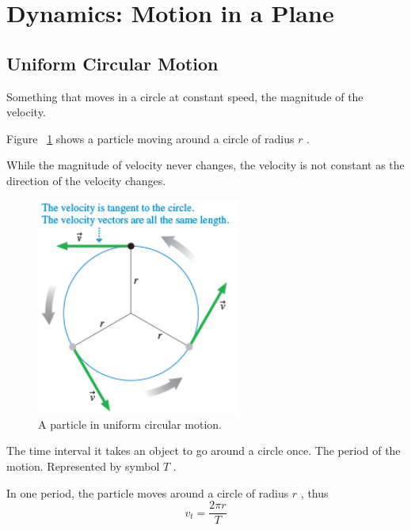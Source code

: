 \section{Dynamics:  Motion in a Plane}

\subsection{Uniform Circular Motion}

\begin{definition}
    Something that moves in a circle at constant speed, the magnitude of
    the velocity.
\end{definition}

Figure~%
\ref{fig:uniform-circular-motion} shows a particle moving around a
circle of radius
$
    r
$%
.
\begin{remark}
    While the magnitude of velocity never changes, the velocity is not
    constant as the direction of the velocity changes.
\end{remark}
\begin{figure}
    \centering
    \includegraphics[width=0.6\textwidth]{../figures/uniform-circular-motion.png}
    \caption{A particle in uniform circular motion.}%
    \label{fig:uniform-circular-motion}
\end{figure}

\begin{definition}[Revolution]
    The time interval it takes an object to go around a circle once.
    The period of the motion.  Represented by symbol
    $
        T
    $%
    .
\end{definition}

In one period, the particle moves around a circle of radius
$
    r
$%
, thus
\begin{equation}
    \label{eq:avg-circular-speed} v_{t}=\frac{2\pi r}{T}
\end{equation}

